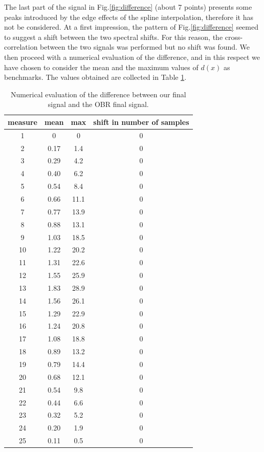 The last part of the signal in Fig.\ref{fig:difference} (about 7 points) presents some peaks introduced by the edge effects of the spline interpolation, therefore it has not be considered.
At a first impression, the pattern of Fig.\ref{fig:difference} seemed to suggest a shift between the two spectral shifts. For this reason, the cross-correlation between the two signals was performed but no shift was found.
We then proceed with a numerical evaluation of the difference, and in this respect we have chosen to consider the mean and the maximum values of $d(x)$ as benchmarks. The values obtained are collected in Table \ref{table:difference}.

\begin{table}[h]
\centering
 \begin{tabular}{c|c|c|c}
    measure & mean & max & shift in number of samples\\
    \hline
        1 &  0    & 0     & 0 \\
        2 &  0.17 &  1.4  & 0 \\
        3 &  0.29 &  4.2  & 0 \\
        4 &  0.40 &  6.2  & 0 \\
        5 &  0.54 &  8.4  & 0 \\
        6 &  0.66 & 11.1  & 0 \\
        7 &  0.77 & 13.9  & 0 \\
        8 &  0.88 & 13.1  & 0 \\
        9 &  1.03 & 18.5  & 0 \\
        10 &  1.22 & 20.2  & 0 \\
        11 &  1.31 & 22.6  & 0 \\
        12 &  1.55 & 25.9  & 0 \\
        13 &  1.83 & 28.9  & 0 \\
        14 &  1.56 & 26.1  & 0 \\
        15 &  1.29 & 22.9  & 0 \\
        16 &  1.24 & 20.8  & 0 \\
        17 &  1.08 & 18.8  & 0 \\
        18 &  0.89 & 13.2  & 0 \\
        19 &  0.79 & 14.4  & 0 \\
        20 &  0.68 & 12.1  & 0 \\
        21 &  0.54 &  9.8  & 0 \\
        22 &  0.44 &  6.6  & 0 \\
        23 &  0.32 &  5.2  & 0 \\
        24 &  0.20 &  1.9  & 0 \\
        25 &  0.11 &  0.5  & 0 \\
 \end{tabular}
\caption{Numerical evaluation of the difference between our final signal and the OBR final signal.}
 \label{table:difference}
\end{table}

